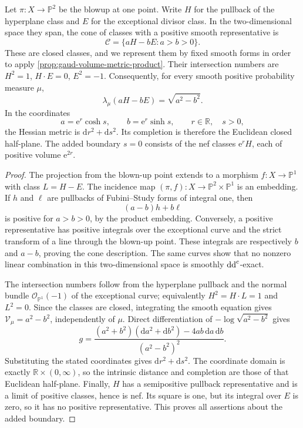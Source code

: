 \begin{example}\label{ex:gaud-metric-blowup}
Let $\pi:X\to\mathbb P^2$ be the blowup at one point. Write $H$ for the pullback of the hyperplane class and $E$ for the exceptional divisor class. In the two-dimensional space they span, the cone of classes with a positive smooth representative is
\[
 \mathscr C=\{aH-bE:a>b>0\}.
\]
These are closed classes, and we represent them by fixed smooth forms in order to apply \cref{prop:gaud-volume-metric-product}. Their intersection numbers are
$H^2=1$, $H\cdot E=0$, $E^2=-1$.
Consequently, for every smooth positive probability measure $\mu$,
\[
 \lambda_\mu(aH-bE)=\sqrt{a^2-b^2}.
\]
In the coordinates
\[
 a=\mathrm{e}^r\cosh s,\qquad b=\mathrm{e}^r\sinh s,
 \qquad r\in\mathbb R,\quad s>0,
\]
the Hessian metric is $\mathrm{d}r^2+\mathrm{d}s^2$. Its completion is therefore the Euclidean closed half-plane. The added boundary $s=0$ consists of the nef classes $\mathrm{e}^rH$, each of positive volume $\mathrm{e}^{2r}$.
\end{example}
\begin{proof}
The projection from the blown-up point extends to a morphism $f:X\to\mathbb P^1$ with class $L=H-E$. The incidence map $(\pi,f):X\to\mathbb P^2\times\mathbb P^1$ is an embedding. If $h$ and $\ell$ are pullbacks of Fubini--Study forms of integral one, then
\[
 (a-b)h+b\ell
\]
is positive for $a>b>0$, by the product embedding. Conversely, a positive representative has positive integrals over the exceptional curve and the strict transform of a line through the blown-up point. These integrals are respectively $b$ and $a-b$, proving the cone description. The same curves show that no nonzero linear combination in this two-dimensional space is smoothly $\mathrm{dd}^{\mathrm{c}}$-exact.

The intersection numbers follow from the hyperplane pullback and the normal bundle $\mathcal O_{\mathbb P^1}(-1)$ of the exceptional curve; equivalently $H^2=H\cdot L=1$ and $L^2=0$. Since the classes are closed, integrating the smooth equation gives $\mathcal V_\mu=a^2-b^2$, independently of $\mu$. Direct differentiation of $-\log\sqrt{a^2-b^2}$ gives
\[
 g=\frac{(a^2+b^2)(\mathrm{d}a^2+\mathrm{d}b^2)-4ab\,\mathrm{d}a\,\mathrm{d}b}
            {(a^2-b^2)^2}.
\]
Substituting the stated coordinates gives $\mathrm{d}r^2+\mathrm{d}s^2$. The coordinate domain is exactly $\mathbb R\times(0,\infty)$, so the intrinsic distance and completion are those of that Euclidean half-plane. Finally, $H$ has a semipositive pullback representative and is a limit of positive classes, hence is nef. Its square is one, but its integral over $E$ is zero, so it has no positive representative. This proves all assertions about the added boundary.
\end{proof}




